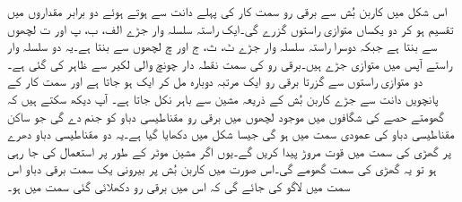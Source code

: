 اس شکل میں کاربن بُش سے برقی رو سمت کار کی پہلے دانت سے ہوتے ہوئے دو برابر مقداروں میں تقسیم ہو کر دو یکساں متوازی راستوں گزرے گی۔ایک راستہ سلسلہ وار جڑے الف، ب، پ اور ت لچھوں سے بنتا ہے جبکہ دوسرا راستہ سلسلہ وار جڑے ٹ، ث، ج اور چ لچھوں سے بنتا ہے۔یہ دو سلسلہ وار راستے آپس میں متوازی جڑے ہیں۔برقی رو کی سمت نقطہ دار چونچ والی لکیر سے ظاہر کی گئی ہے۔دو متوازی راستوں سے گزرتا برقی رو ایک مرتبہ دوبارہ مل کر ایک ہو جاتا ہے اور سمت کار کے پانچویں دانت سے جڑے کاربن بُش کے ذریعہ مشین سے باہر نکل جاتا ہے۔ آپ دیکھ سکتے ہیں کہ گھومتے حصے کی شگافوں میں موجود لچھوں میں برقی رو مقناطیسی دباو کو جنم دے گی جو ساکن مقناطیسی دباو کی عمودی سمت میں ہو گی جیسا شکل   میں دکھایا گیا ہے۔یہ دو مقناطیسی دباو دھرے پر گھڑی کی سمت میں قوت مروڑ پیدا کریں گے۔یوں اگر مشین موٹر کے طور پر استعمال کی جا رہی ہو تو یہ گھڑی کی سمت گھومے گی۔اس صورت میں کاربن بُش پر بیرونی یک سمت  برقی دباو اس سمت میں لاگو کی جائے گی کہ اس میں برقی رو دکھلائی گئی سمت میں ہو۔
